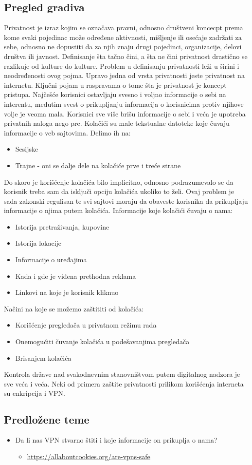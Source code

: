 \documentclass[a4paper,12pt]{article}
\begin{document}
\subsection{Pregled gradiva}
Privatnost je izraz kojim se označava pravni, odnosno društveni koncecpt prema kome svaki pojedinac može određene aktivnosti, mišljenje ili osećaje zadržati za sebe, odnosno ne dopustiti da za njih znaju drugi pojedinci, organizacije, delovi društva ili javnost. Definisanje šta tačno čini, a šta ne čini privatnost drastično se razlikuje od kulture do kulture. Problem u definisanju privatnosti leži u širini i neodređenosti ovog pojma. Upravo jedna od vrsta privatnosti jeste privatnost na internetu. Ključni pojam u raspravama o tome šta je privatnost je koncept pristupa. Najčešće korisnici ostavljaju svesno i voljno informacije o sebi na interentu, međutim svest o prikupljanju informacija o korisnicima protiv njihove volje je veoma mala. Korisnici sve više brišu informacije o sebi i veća je upotreba privatnih naloga nego pre. 
Kolačići su male tekstualne datoteke koje čuvaju informacije o veb sajtovima. Delimo ih na:
\begin{itemize}
    \item Sesijske
    \item Trajne - oni se dalje dele na kolačiće prve i treće strane
\end{itemize}
Do skoro je korišćenje kolačića bilo implicitno, odnosno podrazumevalo se da korisnik treba sam da isključi opciju kolačića ukoliko to želi. Ovaj problem je sada zakonski regulisan te svi sajtovi moraju da obaveste korisnika da prikupljaju informacije o njima putem kolačića.
Informacije koje kolačići čuvaju o nama:
\begin{itemize}
    \item Istorija pretraživanja, kupovine
    \item Istorija lokacije
    \item Informacije o uređajima
    \item Kada i gde je viđena prethodna reklama
    \item Linkovi na koje je korisnik kliknuo
\end{itemize}
Načini na koje se možemo zaštititi od kolačića:
\begin{itemize}
    \item Korišćenje pregledača u privatnom režimu rada
    \item Onemogućiti čuvanje kolačića u podešavanjima pregledača
    \item Brisanjem kolačića
\end{itemize}
Kontrola države nad svakodnevnim stanovništvom putem digitalnog nadzora je sve veća i veća.
Neki od primera zaštite privatnosti prilikom korišćenja interneta su enkripcija i VPN.
\subsection{Predložene teme}
\begin{itemize}
    \item Da li nas VPN stvarno štiti i koje informacije on prikuplja o nama?
    \begin{itemize}
        \item \url{https://allaboutcookies.org/are-vpns-safe}
    \end{itemize}
\end{itemize}
\end{document}
